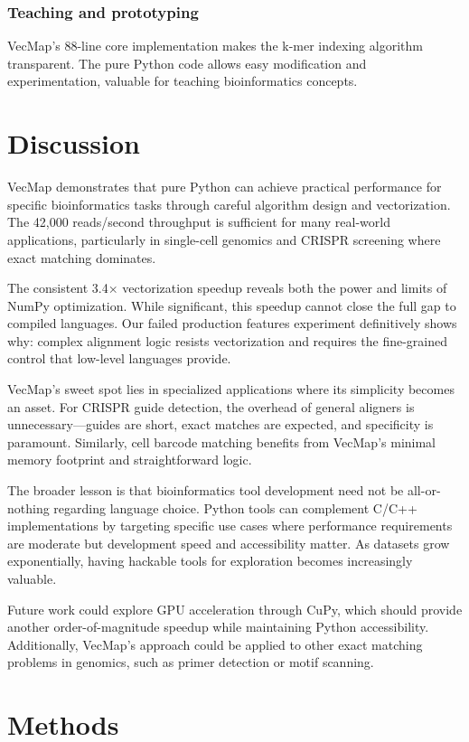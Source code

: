 \documentclass[12pt]{article}
\begin{document}
\subsubsection{Teaching and prototyping}
VecMap's 88-line core implementation makes the k-mer indexing algorithm transparent. The pure Python code allows easy modification and experimentation, valuable for teaching bioinformatics concepts.

\section{Discussion}

VecMap demonstrates that pure Python can achieve practical performance for specific bioinformatics tasks through careful algorithm design and vectorization. The 42,000 reads/second throughput is sufficient for many real-world applications, particularly in single-cell genomics and CRISPR screening where exact matching dominates.

The consistent 3.4× vectorization speedup reveals both the power and limits of NumPy optimization. While significant, this speedup cannot close the full gap to compiled languages. Our failed production features experiment definitively shows why: complex alignment logic resists vectorization and requires the fine-grained control that low-level languages provide.

VecMap's sweet spot lies in specialized applications where its simplicity becomes an asset. For CRISPR guide detection, the overhead of general aligners is unnecessary---guides are short, exact matches are expected, and specificity is paramount. Similarly, cell barcode matching benefits from VecMap's minimal memory footprint and straightforward logic.

The broader lesson is that bioinformatics tool development need not be all-or-nothing regarding language choice. Python tools can complement C/C++ implementations by targeting specific use cases where performance requirements are moderate but development speed and accessibility matter. As datasets grow exponentially, having hackable tools for exploration becomes increasingly valuable.

Future work could explore GPU acceleration through CuPy, which should provide another order-of-magnitude speedup while maintaining Python accessibility. Additionally, VecMap's approach could be applied to other exact matching problems in genomics, such as primer detection or motif scanning.

\section{Methods}
\end{document}
